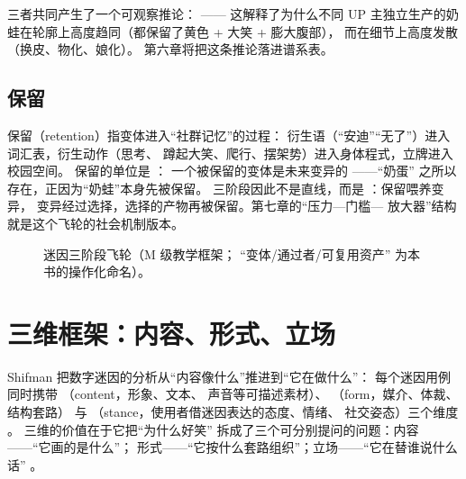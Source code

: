 三者共同产生了一个可观察推论：
 ——
 这解释了为什么不同 UP 主独立生产的奶蛙在轮廓上高度趋同（都保留了黄色 + 大笑 + 膨大腹部），
 而在细节上高度发散（换皮、物化、娘化）。
 第六章将把这条推论落进谱系表。

\subsection{保留}

保留（retention）指变体进入“社群记忆”的过程：
 衍生语（“安迪”“无了”）进入词汇表，衍生动作（思考、
 蹲起大笑、爬行、摆架势）进入身体程式，立牌进入校园空间。
 保留的单位是 ：
 一个被保留的变体是未来变异的 ——“奶蛋”
 之所以存在，正因为“奶蛙”本身先被保留。
 三阶段因此不是直线，而是  ：保留喂养变异，
 变异经过选择，选择的产物再被保留。第七章的“压力—门槛—
放大器”结构就是这个飞轮的社会机制版本。

\begin{figure}[htbp]\centering
{}
  \caption{迷因三阶段飞轮（M 级教学框架；
          “变体/通过者/可复用资产”
          为本书的操作化命名）。}
  \label{fig:05:wheel}
\end{figure}

\section{三维框架：内容、形式、立场}\label{sec:05:shifman}

Shifman 把数字迷因的分析从“内容像什么”推进到“它在做什么”：
 每个迷因用例同时携带  （content，形象、文本、
 声音等可描述素材）、  （form，媒介、体裁、结构套路）
 与  （stance，使用者借迷因表达的态度、情绪、
 社交姿态）三个维度 \cite{shifman2013memes}。
 三维的价值在于它把“为什么好笑”
 拆成了三个可分别提问的问题：内容——“它画的是什么”；
 形式——“它按什么套路组织”；立场——“它在替谁说什么话”
 。

